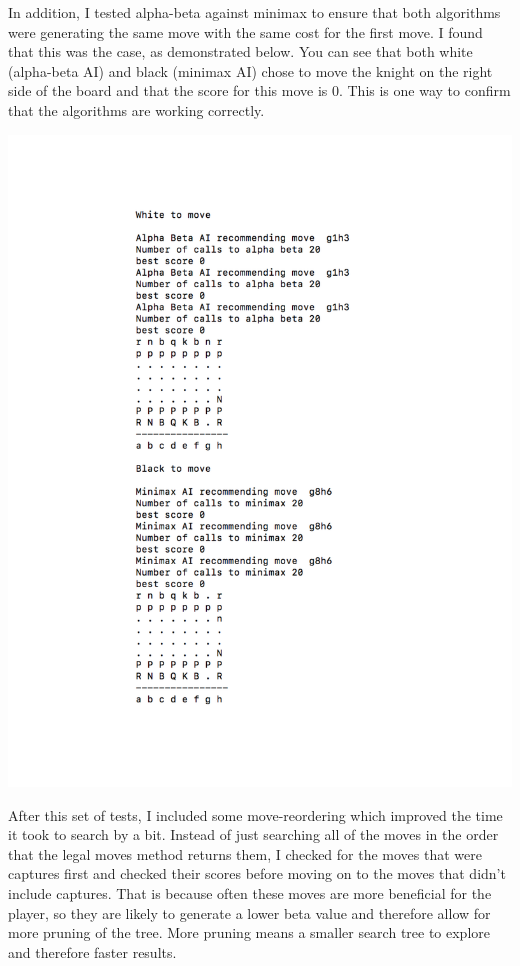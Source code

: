 \documentclass{article}
\begin{document}
In addition, I tested alpha-beta against minimax to ensure that both algorithms were generating the same move with the same cost for the first move. I found that this was the case, as demonstrated below. You can see that both white (alpha-beta AI) and black (minimax AI) chose to move the knight on the right side of the board and that the score for this move is 0. This is one way to confirm that the algorithms are working correctly. 

\includegraphics[width=\textwidth]{alpha-beta_vs_minimax.pdf}

After this set of tests, I included some move-reordering which improved the time it took to search by a bit. Instead of just searching all of the moves in the order that the legal moves method returns them, I checked for the moves that were captures first and checked their scores before moving on to the moves that didn't include captures. That is because often these moves are more beneficial for the player, so they are likely to generate a lower beta value and therefore allow for more pruning of the tree. More pruning means a smaller search tree to explore and therefore faster results. 
\end{document}
